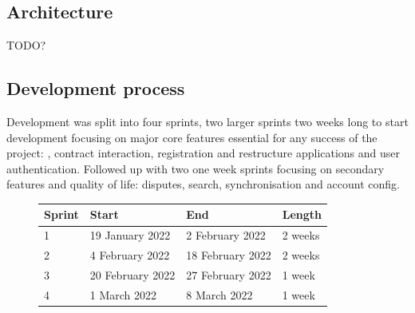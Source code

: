 \subsection{Architecture}
TODO?

\subsection{Development process}

Development was split into four sprints, two larger sprints two weeks long to start development focusing on major core features essential for any success of the project: , contract interaction, registration and restructure applications and user authentication. Followed up with two one week sprints focusing on secondary features and quality of life: disputes, search, synchronisation and account config.

\begin{figure}[H]
\hfil
\begin{tabular}{|p{}|p{}|p{}|p{}|}
\hline
Sprint & Start            & End              & Length  \\ \hline
1      & 19 January 2022  & 2 February 2022  & 2 weeks \\ \hline
2      & 4 February 2022  & 18 February 2022 & 2 weeks \\ \hline
3      & 20 February 2022 & 27 February 2022 & 1 week  \\ \hline
4      & 1 March 2022     & 8 March 2022     & 1 week  \\ \hline
\end{tabular}
\end{figure}